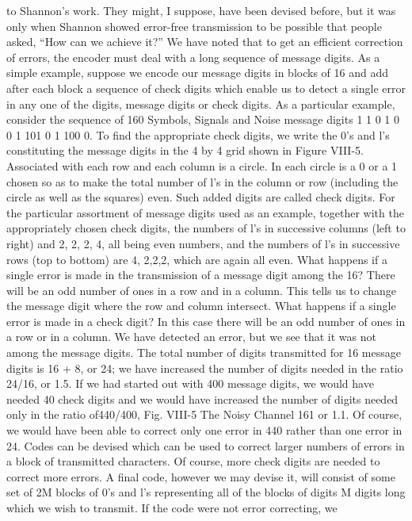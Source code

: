 {{{{{{{{{{to Shannon’s work. They might, I suppose, have been devised
before, but it was only when Shannon showed error-free transmission
to be possible that people asked, “How can we achieve it?”
We have noted that to get an efficient correction of errors, the
encoder must deal with a long sequence of message digits. As a
simple example, suppose we encode our message digits in blocks of
16 and add after each block a sequence of check digits which enable
us to detect a single error in any one of the digits, message digits
or check digits. As a particular example, consider the sequence of
160
Symbols, Signals and Noise
message digits 1 1 0 1 0 0 1 101 0 1 100 0. To find the
appropriate check digits, we write the 0’s and l’s constituting the
message digits in the 4 by 4 grid shown in Figure VIII-5. Associated
with each row and each column is a circle. In each circle is
a 0 or a 1 chosen so as to make the total number of l’s in the
column or row (including the circle as well as the squares) even.
Such added digits are called check digits. For the particular assortment
of message digits used as an example, together with the
appropriately chosen check digits, the numbers of l’s in successive
columns (left to right) and 2, 2, 2, 4, all being even numbers, and
the numbers of l’s in successive rows (top to bottom) are 4, 2,2,2,
which are again all even.
What happens if a single error is made in the transmission of a
message digit among the 16? There will be an odd number of ones
in a row and in a column. This tells us to change the message digit
where the row and column intersect.
What happens if a single error is made in a check digit? In this
case there will be an odd number of ones in a row or in a column.
We have detected an error, but we see that it was not among the
message digits.
The total number of digits transmitted for 16 message digits is
16 + 8, or 24; we have increased the number of digits needed in
the ratio 24/16, or 1.5. If we had started out with 400 message
digits, we would have needed 40 check digits and we would have
increased the number of digits needed only in the ratio of440/400,
Fig. VIII-5
The Noisy Channel
161
or 1.1. Of course, we would have been able to correct only one
error in 440 rather than one error in 24.
Codes can be devised which can be used to correct larger numbers
of errors in a block of transmitted characters. Of course, more
check digits are needed to correct more errors. A final code, however
we may devise it, will consist of some set of 2M blocks of 0’s
and l’s representing all of the blocks of digits M digits long which
we wish to transmit. If the code were not error correcting, we
}}}}}}}}}}
